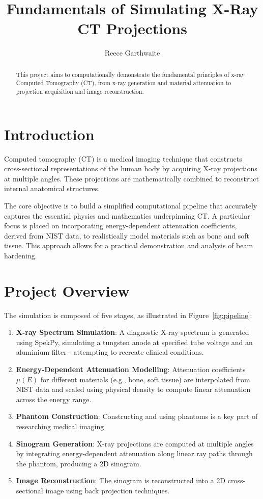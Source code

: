 \documentclass{article}
\title{Fundamentals of Simulating X-Ray CT Projections}
\author{Reece Garthwaite}
\date{}
\theoremstyle{definition}
\begin{document}
\maketitle

\begin{abstract}
This project aims to computationally demonstrate the fundamental principles of x-ray Computed Tomography (CT), from x-ray generation and material attenuation to projection acquisition and image reconstruction.
\end{abstract}

\section{Introduction}
Computed tomography (CT) is a medical imaging technique that constructs cross-sectional representations of the human body by acquiring X-ray projections at multiple angles. These projections are mathematically combined to reconstruct internal anatomical structures.

The core objective is to build a simplified computational pipeline that accurately captures the essential physics and mathematics underpinning CT. A particular focus is placed on incorporating energy-dependent attenuation coefficients, derived from NIST data, to realistically model materials such as bone and soft tissue. This approach allows for a practical demonstration and analysis of beam hardening.

\section{Project Overview}
The simulation is composed of five stages, as illustrated in Figure~\ref{fig:pipeline}:

\begin{enumerate}
    \item \textbf{X-ray Spectrum Simulation}: A diagnostic X-ray spectrum is generated using SpekPy, simulating a tungsten anode at specified tube voltage and an aluminium filter - attempting to recreate clinical conditions.

    \item \textbf{Energy-Dependent Attenuation Modelling}: Attenuation coefficients $\mu(E)$ for different materials (e.g., bone, soft tissue) are interpolated from NIST data and scaled using physical density to compute linear attenuation across the energy range.

    \item \textbf{Phantom Construction}: Constructing and using phantoms is a key part of researching medical imaging

    \item \textbf{Sinogram Generation}: X-ray projections are computed at multiple angles by integrating energy-dependent attenuation along linear ray paths through the phantom, producing a 2D sinogram.

    \item \textbf{Image Reconstruction}: The sinogram is reconstructed into a 2D cross-sectional image using back projection techniques.
\end{enumerate}
\end{document}
